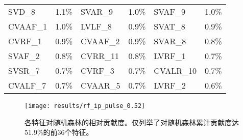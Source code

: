 \begin{center}
\begin{longtable}{m{2cm}<{\centering}m{2cm}<{\centering}m{2cm}<{\centering}m{2cm}<{\centering}m{2cm}<{\centering}m{2cm}<{\centering}}
            SVD\_8                           & 1.1\%                            & SVAR\_9                          & 1.0\%                            & SVAF\_9                          & 1.0\%                            \\
            CVAAF\_1                         & 1.0\%                            & LVLF\_8                          & 0.9\%                            & SVAT\_8                          & 0.9\%                            \\
            CVRF\_1                          & 0.9\%                            & CVAAF\_2                         & 0.9\%                            & SVAR\_8                          & 0.8\%                            \\
            SVAF\_2                          & 0.8\%                            & CVRR\_11                         & 0.8\%                            & LVRF\_1                          & 0.7\%                            \\
            SVSR\_7                          & 0.7\%                            & CVRF\_3                          & 0.7\%                            & CVALR\_10                        & 0.7\%                            \\
            CVALF\_7                         & 0.7\%                            & CVAAR\_5                         & 0.7\%                            & LVRF\_2                          & 0.6\%                           
      \end{longtable}
\end{center}

\begin{figure}[htbp]
      \centering
      \texttt{[image: results/rf\_ip\_pulse\_0.52]}
      \caption[各特征对随机森林的相对贡献度]{\label{fig:rf_importance_pulse}各特征对随机森林的相对贡献度。仅列举了对随机森林累计贡献度达51.9\%的前36个特征。}
\end{figure}

